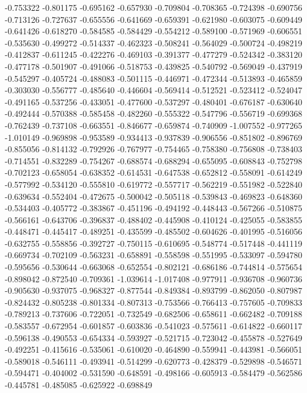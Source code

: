 -0.753322
-0.801175
-0.695162
-0.657930
-0.709804
-0.708365
-0.724398
-0.690756
-0.713126
-0.727637
-0.655556
-0.641669
-0.659391
-0.621980
-0.603075
-0.609449
-0.641426
-0.618270
-0.584585
-0.584429
-0.554212
-0.589100
-0.571969
-0.606551
-0.535630
-0.499272
-0.514337
-0.462323
-0.508241
-0.564029
-0.500724
-0.498219
-0.412837
-0.611245
-0.422276
-0.469103
-0.391377
-0.477279
-0.524342
-0.383120
-0.477178
-0.501907
-0.491066
-0.518753
-0.439825
-0.540792
-0.569049
-0.437919
-0.545297
-0.405724
-0.488083
-0.501115
-0.446971
-0.472344
-0.513893
-0.465859
-0.303030
-0.556777
-0.485640
-0.446604
-0.569414
-0.512521
-0.523412
-0.524047
-0.491165
-0.537256
-0.433051
-0.477600
-0.537297
-0.480401
-0.676187
-0.630640
-0.492444
-0.570388
-0.585458
-0.482260
-0.555322
-0.547796
-0.556719
-0.699368
-0.762439
-0.737108
-0.663551
-0.846677
-0.659874
-0.740909
-1.007552
-0.977265
-1.010149
-0.969898
-0.953589
-0.934413
-0.937839
-0.906556
-0.851802
-0.896769
-0.855056
-0.814132
-0.792926
-0.767977
-0.754465
-0.758380
-0.756808
-0.738403
-0.714551
-0.832289
-0.754267
-0.688574
-0.688294
-0.655095
-0.608843
-0.752798
-0.702123
-0.658054
-0.638352
-0.614531
-0.647538
-0.652812
-0.558091
-0.614249
-0.577992
-0.534120
-0.555810
-0.619772
-0.557717
-0.562219
-0.551982
-0.522840
-0.639634
-0.552404
-0.472675
-0.500042
-0.505118
-0.539843
-0.469823
-0.648360
-0.534403
-0.405772
-0.383867
-0.451196
-0.494192
-0.448443
-0.567266
-0.510875
-0.566161
-0.643706
-0.396837
-0.488402
-0.445908
-0.410124
-0.425055
-0.583855
-0.448471
-0.445417
-0.489251
-0.435599
-0.485502
-0.604626
-0.401995
-0.516056
-0.632755
-0.558856
-0.392727
-0.750115
-0.610695
-0.548774
-0.517448
-0.441119
-0.669734
-0.702109
-0.563231
-0.658891
-0.558598
-0.551995
-0.533097
-0.594780
-0.595656
-0.530644
-0.663068
-0.652554
-0.802121
-0.686186
-0.744814
-0.575654
-0.898042
-0.872540
-0.709361
-1.039614
-1.017408
-0.977911
-0.936708
-0.960736
-0.905630
-0.937075
-0.968327
-0.877544
-0.849384
-0.893799
-0.862050
-0.807987
-0.824432
-0.805238
-0.801334
-0.807313
-0.753566
-0.766413
-0.757605
-0.709833
-0.789213
-0.737606
-0.722051
-0.732549
-0.682506
-0.658611
-0.662482
-0.709188
-0.583557
-0.672954
-0.601857
-0.603836
-0.541023
-0.575611
-0.614822
-0.660117
-0.596138
-0.490553
-0.654334
-0.593927
-0.521715
-0.723042
-0.455878
-0.527649
-0.492251
-0.415616
-0.535061
-0.610020
-0.464890
-0.559941
-0.443981
-0.566051
-0.589018
-0.546111
-0.493941
-0.514299
-0.620773
-0.428379
-0.529898
-0.546571
-0.594471
-0.404002
-0.531590
-0.648591
-0.498166
-0.605913
-0.584479
-0.562586
-0.445781
-0.485085
-0.625922
-0.698849
